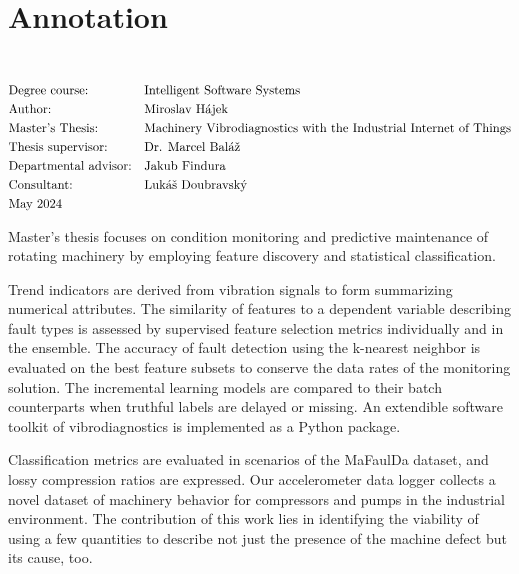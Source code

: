 \thispagestyle{empty}
\section*{Annotation}
\UniversityEN \\
\uppercase{\FacultyEN}
\vspace{-8pt}
{\setlength{\mathindent}{0cm}
\begin{align*}
&\text{Degree course:} && \text{\StudyProgrammeEN} \\
&\text{Author:} && \text{\AuthorEN} \\
&\text{\ThesisEN:} && \text{\TitleEN} \\
&\text{Thesis supervisor:} && \text{\SupervisorEN} \\
&\text{Departmental advisor:} && \text{\DepartmentalAdvisorEN} \\
&\text{Consultant:} && \text{\ConsultantEN} \\
&\text{\DateEN}
\end{align*}}

Master's thesis focuses on condition monitoring and predictive maintenance of rotating machinery by employing feature discovery and statistical classification. 

Trend indicators are derived from vibration signals to form summarizing numerical attributes. The similarity of features to a dependent variable describing fault types is assessed by supervised feature selection metrics individually and in the ensemble. The accuracy of fault detection using the k-nearest neighbor is evaluated on the best feature subsets to conserve the data rates of the monitoring solution. The incremental learning models are compared to their batch counterparts when truthful labels are delayed or missing. An extendible software toolkit of vibrodiagnostics is implemented as a Python package.

Classification metrics are evaluated in scenarios of the MaFaulDa dataset, and lossy compression ratios are expressed. Our accelerometer data logger collects a novel dataset of machinery behavior for compressors and pumps in the industrial environment. The contribution of this work lies in identifying the viability of using a few quantities to describe not just the presence of the machine defect but its cause, too.
\emptypage 

\thispagestyle{empty}
